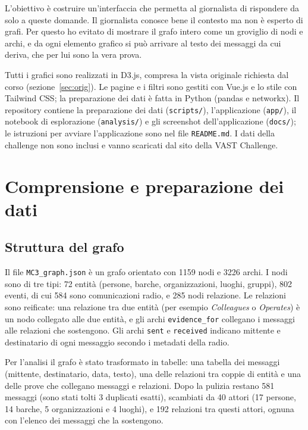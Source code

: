 \documentclass[11pt,a4paper]{article}
\begin{document}
L'obiettivo è costruire un'interfaccia che permetta al giornalista di rispondere da solo a queste domande.
Il giornalista conosce bene il contesto ma non è esperto di grafi. Per questo ho evitato di mostrare il grafo
intero come un groviglio di nodi e archi, e da ogni elemento grafico si può arrivare al testo dei messaggi da
cui deriva, che per lui sono la vera prova.

Tutti i grafici sono realizzati in D3.js, compresa la vista originale richiesta dal corso
(sezione~\ref{sec:orig}). Le pagine e i filtri sono gestiti con Vue.js e lo stile con Tailwind CSS; la
preparazione dei dati è fatta in Python (pandas e networkx). Il repository contiene la preparazione dei dati
(\texttt{scripts/}), l'applicazione (\texttt{app/}), il notebook di esplorazione
(\texttt{analysis/}) e gli screenshot dell'applicazione (\texttt{docs/}); le istruzioni per avviare l'applicazione sono nel file
\texttt{README.md}. I dati della challenge non sono inclusi e vanno scaricati dal sito della VAST Challenge.

\section{Comprensione e preparazione dei dati}
\subsection{Struttura del grafo}
Il file \texttt{MC3\_graph.json} è un grafo orientato con 1159 nodi e 3226 archi. I nodi sono di tre tipi:
72 entità (persone, barche, organizzazioni, luoghi, gruppi), 802 eventi, di cui 584 sono comunicazioni radio,
e 285 nodi relazione. Le relazioni sono reificate: una relazione tra due entità (per esempio
\emph{Colleagues} o \emph{Operates}) è un nodo collegato alle due entità, e gli archi \texttt{evidence\_for}
collegano i messaggi alle relazioni che sostengono. Gli archi \texttt{sent} e \texttt{received} indicano
mittente e destinatario di ogni messaggio secondo i metadati della radio.

Per l'analisi il grafo è stato trasformato in tabelle: una tabella dei messaggi (mittente, destinatario, data,
testo), una delle relazioni tra coppie di entità e una delle prove che collegano messaggi e relazioni. Dopo
la pulizia restano 581 messaggi (sono stati tolti 3 duplicati esatti), scambiati da 40 attori (17 persone,
14 barche, 5 organizzazioni e 4 luoghi), e 192 relazioni tra questi attori, ognuna con l'elenco dei messaggi
che la sostengono.
\end{document}
